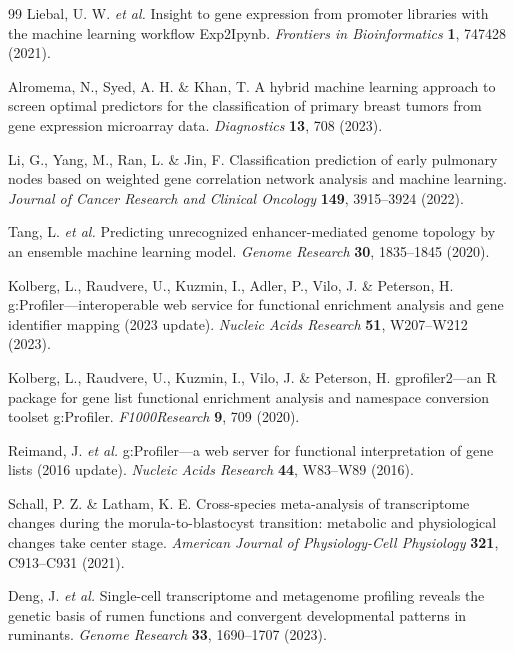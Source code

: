 \begin{thebibliography}{99}
 Liebal, U. W. \textit{et al.} Insight to gene expression from promoter libraries with the machine learning workflow Exp2Ipynb. \textit{Frontiers in Bioinformatics} \textbf{1}, 747428 (2021).

 Alromema, N., Syed, A. H. \& Khan, T. A hybrid machine learning approach to screen optimal predictors for the classification of primary breast tumors from gene expression microarray data. \textit{Diagnostics} \textbf{13}, 708 (2023).

 Li, G., Yang, M., Ran, L. \& Jin, F. Classification prediction of early pulmonary nodes based on weighted gene correlation network analysis and machine learning. \textit{Journal of Cancer Research and Clinical Oncology} \textbf{149}, 3915--3924 (2022).

 Tang, L. \textit{et al.} Predicting unrecognized enhancer-mediated genome topology by an ensemble machine learning model. \textit{Genome Research} \textbf{30}, 1835--1845 (2020).

 Kolberg, L., Raudvere, U., Kuzmin, I., Adler, P., Vilo, J. \& Peterson, H. g:Profiler---interoperable web service for functional enrichment analysis and gene identifier mapping (2023 update). \textit{Nucleic Acids Research} \textbf{51}, W207--W212 (2023).

 Kolberg, L., Raudvere, U., Kuzmin, I., Vilo, J. \& Peterson, H. gprofiler2---an R package for gene list functional enrichment analysis and namespace conversion toolset g:Profiler. \textit{F1000Research} \textbf{9}, 709 (2020).

 Reimand, J. \textit{et al.} g:Profiler---a web server for functional interpretation of gene lists (2016 update). \textit{Nucleic Acids Research} \textbf{44}, W83--W89 (2016).

 Schall, P. Z. \& Latham, K. E. Cross-species meta-analysis of transcriptome changes during the morula-to-blastocyst transition: metabolic and physiological changes take center stage. \textit{American Journal of Physiology-Cell Physiology} \textbf{321}, C913--C931 (2021).

 Deng, J. \textit{et al.} Single-cell transcriptome and metagenome profiling reveals the genetic basis of rumen functions and convergent developmental patterns in ruminants. \textit{Genome Research} \textbf{33}, 1690--1707 (2023).


\end{thebibliography}
